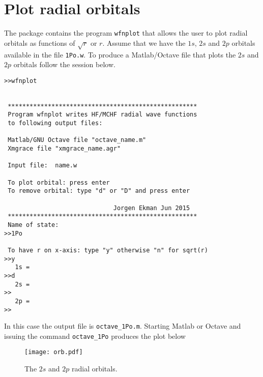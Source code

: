 \documentclass[fleqn,10pt]{book}
\begin{document}
\section{Plot radial orbitals}
The package contains the program \verb+wfnplot+ that allows the user to plot radial orbitals as functions of $\sqrt{r}$ or $r$. Assume that we have the $1s$, $2s$ and $2p$ orbitals
available in the file \verb+1Po.w+. To produce a Matlab/Octave file that plots the $2s$ and $2p$ orbitals follow the session below.

\begin{verbatim}
>>wfnplot


 ****************************************************
 Program wfnplot writes HF/MCHF radial wave functions
 to following output files:

 Matlab/GNU Octave file "octave_name.m"
 Xmgrace file "xmgrace_name.agr"

 Input file:  name.w

 To plot orbital: press enter
 To remove orbital: type "d" or "D" and press enter

                              Jorgen Ekman Jun 2015
 ****************************************************
 Name of state:
>>1Po

 To have r on x-axis: type "y" otherwise "n" for sqrt(r)
>>y
   1s = 
>>d	
   2s =
>>	
   2p =
>>	
\end{verbatim}

\noindent
In this case the output file is \verb+octave_1Po.m+. Starting Matlab or Octave and issuing the command
\verb+octave_1Po+ produces the plot below

\begin{center}
\begin{figure}[h!]
\texttt{[image: orb.pdf]}
  \caption{The $2s$ and $2p$ radial orbitals.}
\end{figure}
\end{center}
\end{document}
